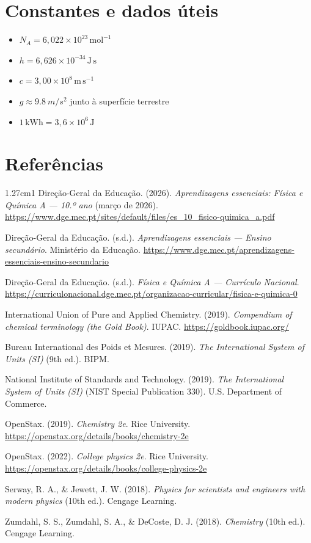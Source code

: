 \documentclass[11pt,a4paper,oneside]{book}
\begin{document}
\chapter*{Constantes e dados úteis}
\begin{itemize}
  \item $N_A=6{,}022\times10^{23}\,\mathrm{mol^{-1}}$
  \item $h=6{,}626\times10^{-34}\,\mathrm{J\,s}$
  \item $c=3{,}00\times10^8\,\mathrm{m\,s^{-1}}$
  \item $g\approx\SI{9.8}{m/s^2}$ junto à superfície terrestre
  \item $1\,\mathrm{kWh}=3{,}6\times10^6\,\mathrm{J}$
\end{itemize}

\chapter*{Referências}
\begin{hangparas}{1.27cm}{1}
Direção-Geral da Educação. (2026). \textit{Aprendizagens essenciais: Física e Química A — 10.º ano} (março de 2026). \url{https://www.dge.mec.pt/sites/default/files/es_10_fisico-quimica_a.pdf}

Direção-Geral da Educação. (s.d.). \textit{Aprendizagens essenciais — Ensino secundário}. Ministério da Educação. \url{https://www.dge.mec.pt/aprendizagens-essenciais-ensino-secundario}

Direção-Geral da Educação. (s.d.). \textit{Física e Química A — Currículo Nacional}. \url{https://curriculonacional.dge.mec.pt/organizacao-curricular/fisica-e-quimica-0}

International Union of Pure and Applied Chemistry. (2019). \textit{Compendium of chemical terminology (the Gold Book)}. IUPAC. \url{https://goldbook.iupac.org/}

Bureau International des Poids et Mesures. (2019). \textit{The International System of Units (SI)} (9th ed.). BIPM.

National Institute of Standards and Technology. (2019). \textit{The International System of Units (SI)} (NIST Special Publication 330). U.S. Department of Commerce.

OpenStax. (2019). \textit{Chemistry 2e}. Rice University. \url{https://openstax.org/details/books/chemistry-2e}

OpenStax. (2022). \textit{College physics 2e}. Rice University. \url{https://openstax.org/details/books/college-physics-2e}

Serway, R. A., \& Jewett, J. W. (2018). \textit{Physics for scientists and engineers with modern physics} (10th ed.). Cengage Learning.

Zumdahl, S. S., Zumdahl, S. A., \& DeCoste, D. J. (2018). \textit{Chemistry} (10th ed.). Cengage Learning.
\end{hangparas}
\end{document}
